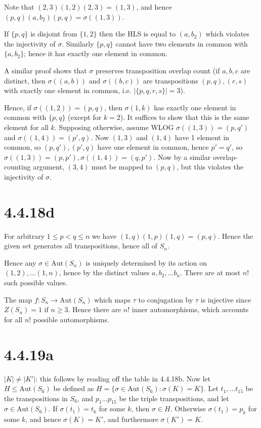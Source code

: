 \documentclass{article}
\def\Aut{\textrm{Aut}}
\begin{document}
Note that $(2, 3)(1, 2)(2, 3) = (1, 3)$, and hence $(p, q)(a, b_2)(p, q) = \sigma((1, 3))$.

If $\{p, q\}$ is disjoint from $\{1, 2\}$ then the HLS is equal to $(a, b_2)$ which violates the injectivity of $\sigma$. Similarly $\{p, q\}$ cannot have two elements in common with $\{a, b_2\}$; hence it has exactly one element in common.

A similar proof shows that $\sigma$ preserves transposition overlap count (if $a, b, c$ are distinct, then $\sigma((a, b))$ and $\sigma((b, c))$ are transpositions $(p, q), (r, s)$ with exactly one element in common, i.e. $|\{p, q, r, s\}| = 3$).

Hence, if $\sigma((1, 2)) = (p, q)$, then $\sigma(1, k)$ has exactly one element in common with $\{p, q\}$ (except for $k=2$). It suffices to show that this is the same element for all $k$. Supposing otherwise, assume WLOG $\sigma((1, 3)) = (p, q')$ and $\sigma((1, 4)) = (p', q)$. Now $(1, 3)$ and $(1, 4)$ have 1 element in common, so $(p, q'), (p', q)$ have one element in common, hence $p' = q'$, so $\sigma((1, 3)) = (p, p'), \sigma((1, 4)) = (q, p')$. Now by a similar overlap-counting argument, $(3, 4)$ must be mapped to $(p, q)$, but this violates the injectivity of $\sigma$.

\section*{4.4.18d}

For arbitrary $1 \le p < q \le n$ we have $(1, q)(1, p)(1, q) = (p, q)$. Hence the given set generates all transpositions, hence all of $S_n$.

Hence any $\sigma \in \Aut(S_n)$ is uniquely determined by its action on $(1, 2), \ldots (1, n)$, hence by the distinct values $a, b_2, \ldots b_n$. There are at most $n!$ such possible values.

The map $f : S_n \to \Aut(S_n)$ which maps $\tau$ to conjugation by $\tau$ is injective since $Z(S_n) = 1$ if $n \ge 3$. Hence there are $n!$ inner automorphisms, which accounts for all $n!$ possible automorphisms.

\section*{4.4.19a}

$|K| \ne |K'|$: this follows by reading off the table in 4.4.18b. Now let $H \le \Aut(S_6)$ be defined as $H = \{\sigma \in \Aut(S_6) : \sigma(K) = K\}$. Let $t_1, \ldots t_{15}$ be the transpositions in $S_6$, and $p_1 \ldots p_{15}$ be the triple transpositions, and let $\sigma \in \Aut(S_6)$. If $\sigma(t_1) = t_k$ for some $k$, then $\sigma \in H$. Otherwise $\sigma(t_1) = p_k$ for some $k$, and hence $\sigma(K) = K'$, and furthermore $\sigma(K') = K$.
\end{document}
